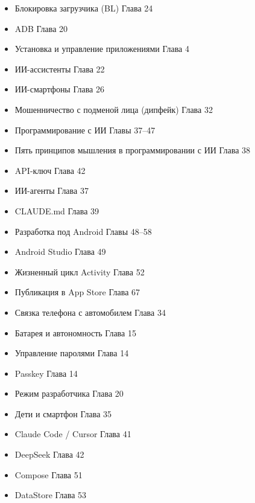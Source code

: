 


\begin{itemize}
  \item Блокировка загрузчика (BL) Глава 24
  \item ADB Глава 20
  \item Установка и управление приложениями Глава 4
  \item ИИ-ассистенты Глава 22
  \item ИИ-смартфоны Глава 26
  \item Мошенничество с подменой лица (дипфейк) Глава 32
  \item Программирование с ИИ Главы 37–47
  \item Пять принципов мышления в программировании с ИИ Глава 38
  \item API-ключ Глава 42
  \item ИИ-агенты Глава 37
  \item CLAUDE.md Глава 39
  \item Разработка под Android Главы 48–58
  \item Android Studio Глава 49
  \item Жизненный цикл Activity Глава 52
  \item Публикация в App Store Глава 67
\end{itemize}


\begin{itemize}
  \item Связка телефона с автомобилем Глава 34
  \item Батарея и автономность Глава 15
  \item Управление паролями Глава 14
  \item Passkey Глава 14
  \item Режим разработчика Глава 20
  \item Дети и смартфон Глава 35
  \item Claude Code / Cursor Глава 41
  \item DeepSeek Глава 42
  \item Compose Глава 51
  \item DataStore Глава 53
\end{itemize}


